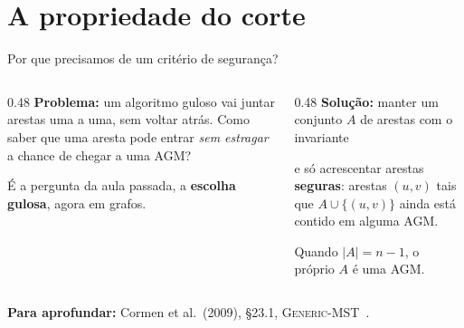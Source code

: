 \documentclass[aspectratio=169,xcolor=table]{beamer}
\newcommand{\fonte}[1]{%
  \vfill
  {\tiny\color{gray!55!black}\textbf{Para aprofundar:} #1\par}%
}
\begin{document}
\section{A propriedade do corte}

\begin{frame}{Por que precisamos de um critério de segurança?}
  \begin{columns}[T]
    \begin{column}{0.48\textwidth}
      \textbf{Problema:} um algoritmo guloso vai juntar arestas uma a uma, sem voltar atrás.
      Como saber que uma aresta pode entrar \emph{sem estragar} a chance de chegar a uma AGM?
      \medskip

      {\small É a pergunta da aula passada, a \textbf{escolha gulosa}, agora em grafos.}
    \end{column}
    \begin{column}{0.48\textwidth}
      \textbf{Solução:} manter um conjunto $A$ de arestas com o invariante
      \begin{center}
      \end{center}
      e só acrescentar arestas \textbf{seguras}: arestas $(u,v)$ tais que
      $A \cup \{(u,v)\}$ ainda está contido em alguma AGM.
      \medskip

      {\small Quando $|A| = n - 1$, o próprio $A$ é uma AGM.}
    \end{column}
  \end{columns}
  \fonte{Cormen et al.\ (2009), \S 23.1, \textsc{Generic-MST}~\cite{cormen2009introduction}.}
\end{frame}
\end{document}
